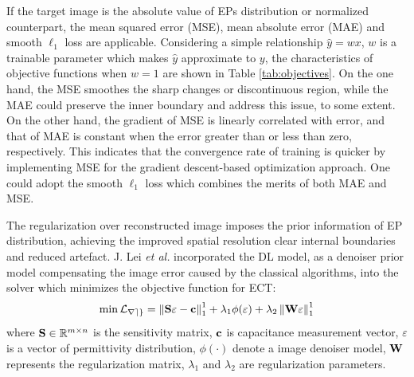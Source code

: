 If the target image is the absolute value of EPs distribution or normalized counterpart, the mean squared error (MSE)\cite{}, mean absolute error (MAE) and smooth $\ell_1$ loss are applicable.
Considering a simple relationship $\widehat y = wx$, $w$ is a trainable parameter which makes $\widehat y $ approximate to $y$, the characteristics of objective functions when $w=1$ are shown in Table \ref{tab:objectives}.
On the one hand, the MSE smoothes the sharp changes or discontinuous region, while the MAE could preserve the inner boundary and address this issue, to some extent.
On the other hand, the gradient of MSE is linearly correlated with error, and that of MAE is constant when the error greater than or less than zero, respectively.
This indicates that the convergence rate of training is quicker by implementing MSE for the gradient descent-based optimization approach.
One could adopt the smooth $\ell_1$ loss which combines the merits of both MAE and MSE.

The regularization over reconstructed image imposes the prior information of EP distribution, achieving the improved spatial resolution clear internal boundaries and reduced artefact. J. Lei \emph{et al.} incorporated the DL model, as a denoiser prior model\cite{Lei2018Deep,Chu2019Prior,Lei2020Computational} compensating the image error caused by the classical algorithms, into the solver which minimizes the objective function for ECT:
\begin{equation}\label{equ:crossentropy}
\min {\cal{L}_{reg}} = \left\| {{\bf{S}}\varepsilon  - {\bf{c}}} \right\|_1^1 + {\lambda _1}\phi (\varepsilon ) + {\lambda _2}\left\| {{\bf{W}}\varepsilon } \right\|_1^1
\end{equation}
where ${\bf{S}} \in {\mathbb{R}^{m \times n}}$ is the sensitivity matrix, $\bf{c}$ is capacitance measurement vector, $\varepsilon$ is a vector of permittivity distribution, $\phi(\cdot)$ denote a image denoiser model, $\bf{W}$ represents the regularization matrix, $\lambda _1$ and $\lambda _2$ are regularization parameters.


